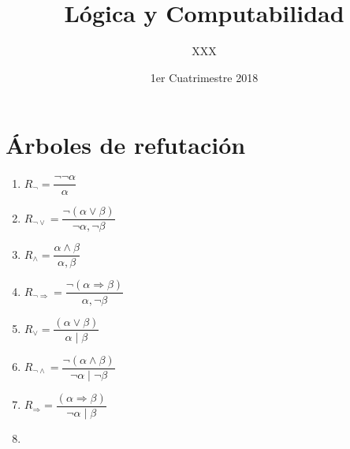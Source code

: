 \documentclass[a4paper,11pt]{article}
\title{Lógica y Computabilidad}
\author{XXX}
\date{1er Cuatrimestre 2018}
\theoremstyle{definition}
\theoremstyle{remark}
\begin{document}
\maketitle

\section{Árboles de refutación}

\begin{multicols}{2}
	\begin{enumerate}
		\item $R_{\lnot} = \dfrac{\lnot\lnot\alpha}{\alpha}$
		
		\item $R_{\lnot\vee} = \dfrac{\lnot(\alpha \vee \beta)}{\lnot\alpha , \lnot\beta}$
		
		\item $R_{\wedge} = \dfrac{\alpha \wedge \beta}{\alpha , \beta}$
		
		\item $R_{\lnot\Rightarrow} = \dfrac{\lnot(\alpha \Rightarrow \beta)}{\alpha , \lnot\beta}$
		
		\item $R_{\vee} = \dfrac{(\alpha \vee \beta)}{\alpha \mathop{|} \beta}$
		
		\item $R_{\lnot\wedge} = \dfrac{\lnot(\alpha \wedge \beta)}{\lnot\alpha \mathop{|} \lnot\beta}$
		
		\item $R_{\Rightarrow} = \dfrac{(\alpha \Rightarrow \beta)}{\lnot\alpha \mathop{|} \beta}$
		
		\item[]
	\end{enumerate}
\end{multicols}
\end{document}
